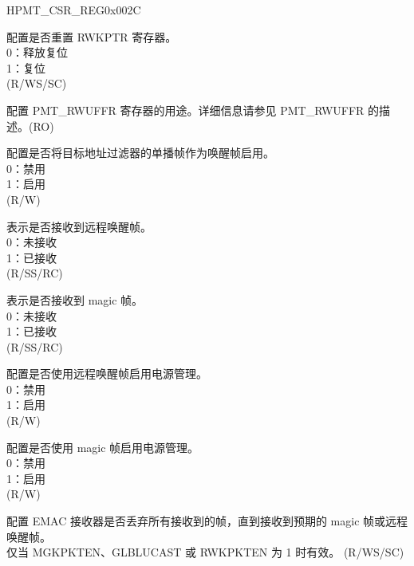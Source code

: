 \begin{register}{H}{PMT\_CSR\_REG}{0x002C}\label{regdesc:PMTCSRREG}
%
%
%
%
%
%
%
%
%
%
%
%
\regnewline%
\begin{regdesc}\begin{reglist}
\item [RWKFILTRST] 配置是否重置 RWKPTR 寄存器。\\
0：释放复位\\
1：复位\\ (R/WS/SC)
\item [RWKPTR] 配置 PMT\_RWUFFR 寄存器的用途。详细信息请参见 PMT\_RWUFFR 的描述。(RO)
\item [GLBLUCAST] 配置是否将目标地址过滤器的单播帧作为唤醒帧启用。\\
0：禁用\\
1：启用\\ (R/W)
\item [RWKPRCVD] 表示是否接收到远程唤醒帧。\\
0：未接收\\
1：已接收\\ (R/SS/RC)
\item [MGKPRCVD] 表示是否接收到 magic 帧。\\
0：未接收\\
1：已接收\\ (R/SS/RC)
\item [RWKPKTEN] 配置是否使用远程唤醒帧启用电源管理。\\
0：禁用\\
1：启用\\ (R/W)
\item [MGKPKTEN] 配置是否使用 magic 帧启用电源管理。\\
0：禁用\\
1：启用\\(R/W)
\item [PWRDWN] 配置 EMAC 接收器是否丢弃所有接收到的帧，直到接收到预期的 magic 帧或远程唤醒帧。\\
仅当 MGKPKTEN、GLBLUCAST 或 RWKPKTEN 为 1 时有效。 (R/WS/SC)


\end{reglist}\end{regdesc}
\end{register}


